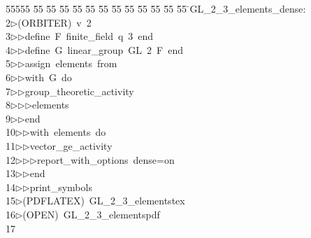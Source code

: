 %
%
\begin{tabbing}
55555 \= 55 \= 55 \= 55 \= 55 \= 55 \= 55 \= 55 \= 55 \= 55 \= 55 \= 55 \= 55 \= \>GL\_2\_3\_elements\_dense:\\[0pt]
2\>$\triangleright$\>(ORBITER)\ v\ 2\ \\[0pt]
3\>$\triangleright$\>$\triangleright$\>define\ F\ finite\_field\ q\ 3\ end\ \\[0pt]
4\>$\triangleright$\>$\triangleright$\>define\ G\ linear\_group\ GL\ 2\ F\ end\ \\[0pt]
5\>$\triangleright$\>$\triangleright$\>assign\ elements\ from\ \\[0pt]
6\>$\triangleright$\>$\triangleright$\>with\ G\ do\ \\[0pt]
7\>$\triangleright$\>$\triangleright$\>group\_theoretic\_activity\ \\[0pt]
8\>$\triangleright$\>$\triangleright$\>$\triangleright$\>elements\ \\[0pt]
9\>$\triangleright$\>$\triangleright$\>end\ \\[0pt]
10\>$\triangleright$\>$\triangleright$\>with\ elements\ do\ \\[0pt]
11\>$\triangleright$\>$\triangleright$\>vector\_ge\_activity\ \\[0pt]
12\>$\triangleright$\>$\triangleright$\>$\triangleright$\>report\_with\_options\ dense=on\ \\[0pt]
13\>$\triangleright$\>$\triangleright$\>end\ \\[0pt]
14\>$\triangleright$\>$\triangleright$\>print\_symbols\\[0pt]
15\>$\triangleright$\>(PDFLATEX)\ GL\_2\_3\_elementstex\\[0pt]
16\>$\triangleright$\>(OPEN)\ GL\_2\_3\_elementspdf\\[0pt]
17\>\end{tabbing}
